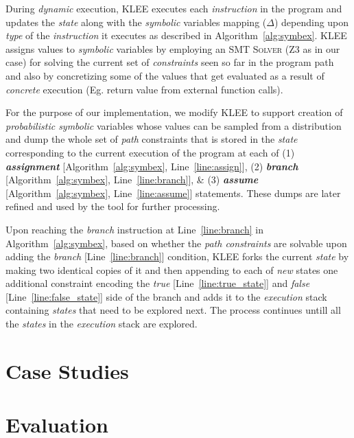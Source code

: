 \documentclass[acmsmall]{acmart}\settopmatter{}
\begin{document}
	During \textit{dynamic} execution, \textsc{KLEE} executes each \textit{instruction} in the program and updates the \textit{state} along with the \textit{symbolic} variables mapping ($\Delta$) depending upon \textit{type} of the \textit{instruction} it executes as described in Algorithm~\ref{alg:symbex}. 
	\textsc{KLEE} assigns values to \textit{symbolic} variables by employing an \textsc{SMT Solver} (\textsc{Z3} as in our case) for solving the current set of \textit{constraints} seen so far in the program path and also by concretizing some of the values that get evaluated as a result of \textit{concrete} execution (Eg. return value from external function calls). 
	
	For the purpose of our implementation, we modify \textsc{KLEE} to support creation of \textit{probabilistic symbolic} variables whose values can be sampled from a distribution and dump the whole set of \textit{path} constraints that is stored in the \textit{state} corresponding to the current execution of the program at each of (1) \textbf{\textit{assignment}} [Algorithm~\ref{alg:symbex}, Line~\ref{line:assign}], (2) \textbf{\textit{branch}} [Algorithm~\ref{alg:symbex}, Line~\ref{line:branch}], \& (3) \textbf{\textit{assume}} [Algorithm~\ref{alg:symbex}, Line~\ref{line:assume}] statements. These dumps are later refined and used by the tool for further processing.
	
	{\color{blue} Upon reaching the \textit{branch} instruction at Line~\ref{line:branch} in Algorithm~\ref{alg:symbex}, based on whether the \textit{path constraints} are solvable upon adding the \textit{branch} [Line~\ref{line:branch}] condition, \textsc{KLEE} forks the current \textit{state} by making two identical copies of it and then appending to each of \textit{new} states one additional constraint encoding the \textit{true} [Line~\ref{line:true_state}] and \textit{false} [Line~\ref{line:false_state}] side of the branch and adds it to the \textit{execution} stack containing \textit{states} that need to be explored next. The process continues untill all the \textit{states} in the \textit{execution} stack are explored.}
	
	\section{Case Studies}
	\label{sec:case_studies}
	
	\section{Evaluation}
	\label{sec:eval}
	
\end{document}
